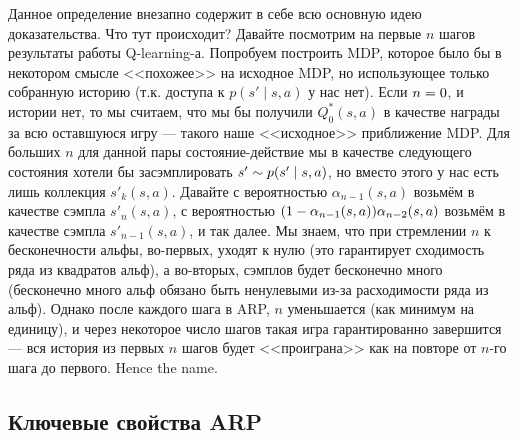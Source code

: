 Данное определение внезапно содержит в себе всю основную идею доказательства. Что тут происходит? Давайте посмотрим на первые $n$ шагов результаты работы Q-learning-а. Попробуем построить MDP, которое было бы в некотором смысле <<похожее>> на исходное MDP, но использующее только собранную историю (т.к. доступа к $p(s' \mid s, a)$ у нас нет). Если $n \HM= 0$, и истории нет, то мы считаем, что мы бы получили $Q^*_0(s, a)$ в качестве награды за всю оставшуюся игру --- такого наше <<исходное>> приближение MDP. Для больших $n$ для данной пары состояние-действие мы в качестве следующего состояния хотели бы засэмплировать $s' \HM\sim p(s' \HM\mid s, a)$, но вместо этого у нас есть лишь коллекция $s'_k(s, a)$. Давайте с вероятностью $\alpha_{n-1}(s, a)$ возьмём в качестве сэмпла $s'_n(s, a)$, с вероятностью $(1 \HM- \alpha_{n-1}(s, a))\alpha_{n-2}(s, a)$ возьмём в качестве сэмпла $s'_{n-1}(s, a)$, и так далее. Мы знаем, что при стремлении $n$ к бесконечности альфы, во-первых, уходят к нулю (это гарантирует сходимость ряда из квадратов альф), а во-вторых, сэмплов будет бесконечно много (бесконечно много альф обязано быть ненулевыми из-за расходимости ряда из альф). Однако после каждого шага в ARP, $n$ уменьшается (как минимум на единицу), и через некоторое число шагов такая игра гарантированно завершится --- вся история из первых $n$ шагов будет <<проиграна>> как на повторе от $n$-го шага до первого. Hence the name.

\subsection{Ключевые свойства ARP}

